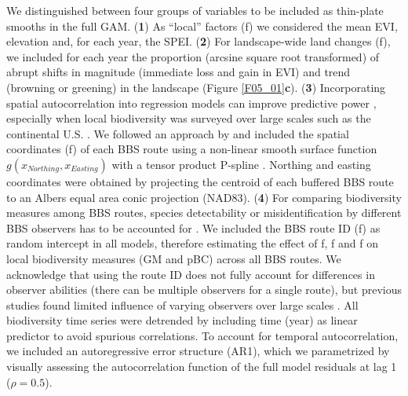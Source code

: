 We distinguished between four groups of variables to be included as thin-plate smooths in the full GAM. (\textbf{1}) As “local” factors (f) we considered the mean EVI, elevation and, for each year, the SPEI. (\textbf{2}) For landscape-wide land changes (f), we included for each year the proportion (arcsine square root transformed) of abrupt shifts in magnitude (immediate loss and gain in EVI) and trend (browning or greening) in the landscape (Figure \ref{F05_01}\textbf{c}). (\textbf{3}) Incorporating spatial autocorrelation into regression models can improve predictive power \citep{Kneib2009,Dornelas2013}, especially when local biodiversity was surveyed over large scales such as the continental U.S. . We followed an approach by \citeauthor{Kneib2009} and included the spatial coordinates (f) of each BBS route using a non-linear smooth surface function $g(x_{Northing},x_{Easting})$ with a tensor product P-spline \citep{Kneib2009}. Northing and easting coordinates were obtained by projecting the centroid of each buffered BBS route to an Albers equal area conic projection (NAD83). (\textbf{4}) For comparing biodiversity measures among BBS routes, species detectability or misidentification by different BBS observers has to be accounted for \citep{Sauer1994,Harris2018}. We included the BBS route ID (f) as random intercept in all models, therefore estimating the effect of f, f and f on local biodiversity measures (GM and pBC) across all BBS routes. We acknowledge that using the route ID does not fully account for differences in observer abilities (there can be multiple observers for a single route), but previous studies found limited influence of varying observers over large scales \citep{Jarzyna2017,Barnagaud2017}. All biodiversity time series were detrended by including time (year) as linear predictor to avoid spurious correlations. To account for temporal autocorrelation, we included an autoregressive error structure (AR1), which we parametrized by visually assessing the autocorrelation function of the full model residuals at lag 1 ($\rho = 0.5$).


